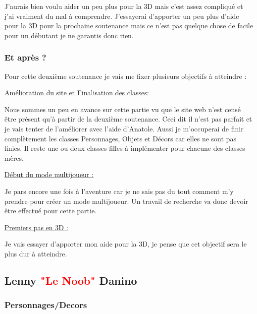 \documentclass{article}
\begin{document}
\par
J'aurais bien voulu aider un peu plus pour la 3D mais c'est assez compliqué et j'ai vraiment du mal à comprendre. J'essayerai d'apporter un peu plus d'aide pour la 3D pour la prochaine soutenance mais ce n'est pas quelque chose de facile pour un débutant je ne garantis donc rien.
\newline

\subsubsection{Et après ?}
\par
Pour cette deuxième soutenance je vais me fixer plusieurs objectifs à atteindre :
\newline

\par
\underline{Amélioration du site et Finalisation des classes:}
\newline
\par
Nous sommes un peu en avance sur cette partie vu que le site web n'est censé être présent qu'à partir de la deuxième soutenance. Ceci dit il n'est pas parfait et je vais tenter de l'améliorer avec l'aide d'Anatole.
Aussi je m'occuperai de finir complètement les classes Personnages, Objets et Décors car elles ne sont pas finies. Il reste une ou deux classes filles à implémenter pour chacune des classes mères.
\newline

\par
\underline{Début du mode multijoueur :}
\newline
\par
Je pars encore une fois à l'aventure car je ne sais pas du tout comment m'y prendre pour créer un mode multijoueur. Un travail de recherche va donc devoir être effectué pour cette partie.
\newline

\par
\underline{Premiers pas en 3D :}
\par
Je vais essayer d'apporter mon aide pour la 3D, je pense que cet objectif sera le plus dur à atteindre.

\newpage

\subsection{Lenny \textcolor{red}{"Le Noob"} Danino}
\subsubsection{Personnages/Decors}
\end{document}
